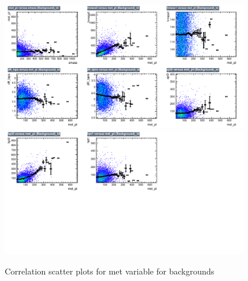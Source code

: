 \begin{figure}[!htb]%
\centering
\includegraphics[width=0.95\textwidth]{figures/CRTT/dataset/plots/correlationscatter_met_pt__Id_c3.pdf}
\includegraphics[width=0.95\textwidth]{figures/CRTT/dataset/plots/correlationscatter_met_pt__Id_c4.pdf}
\caption{ Correlation scatter plots for met variable for backgrounds}%
\label{fig:correlations_CRTT_met_pt_BG}                                                       
\end{figure}





